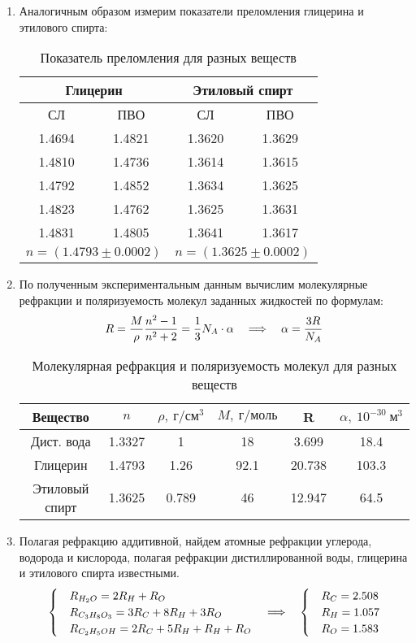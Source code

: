 \documentclass{lab}
\begin{document}
\begin{enumerate}
\item
Аналогичным образом измерим показатели преломления глицерина и этилового спирта:
\begin{table}[H]
	\centering
	\begin{tabular}{|cc|cc|}
		\hline
		\multicolumn{2}{|c|}{Глицерин} & \multicolumn{2}{c|}{Этиловый спирт} \\ \hline
		СЛ & ПВО & СЛ & ПВО \\
		1.4694 & 1.4821 & 1.3620 & 1.3629 \\
		1.4810 & 1.4736 & 1.3614 & 1.3615 \\
		1.4792 & 1.4852 & 1.3634 & 1.3625 \\
		1.4823 & 1.4762 & 1.3625 & 1.3631 \\
		1.4831 & 1.4805 & 1.3641 & 1.3617 \\ \hline
		\multicolumn{2}{|c|}{$ n = (1.4793 \pm 0.0002) $} & \multicolumn{2}{c|}{$ n = (1.3625 \pm 0.0002) $} \\ \hline
	\end{tabular}
	\caption{Показатель преломления для разных веществ}
	\label{tab_3}
\end{table}

\item
По полученным экспериментальным данным вычислим молекулярные рефракции и поляризуемость молекул заданных жидкостей по формулам:
\begin{equation}
R = \dfrac{M}{\rho} \dfrac{n^2 - 1}{n^2 + 2} = \dfrac{1}{3} N_A \cdot \alpha \quad \Longrightarrow \quad \alpha = \dfrac{3R}{N_A}
\end{equation}
\begin{table}[H]
	\centering
	\begin{tabular}{|c|c|c|c|c|c|}
		\hline
		Вещество & $ n $ & $ \rho, ~ г/см^3 $ & $ M, ~ г/моль $ & R & $ \alpha, ~ 10^{-30} ~ м^3 $ \\ \hline
		Дист. вода & 1.3327 & 1 & 18 & 3.699 & 18.4 \\
		Глицерин & 1.4793 & 1.26 & 92.1 & 20.738 & 103.3 \\
		Этиловый спирт & 1.3625 & 0.789 & 46 & 12.947 & 64.5 \\ \hline
	\end{tabular}
	\caption{Молекулярная рефракция и поляризуемость молекул для разных веществ}
	\label{tab_4}
\end{table}

\item
Полагая рефракцию аддитивной, найдем атомные рефракции углерода, водорода и кислорода, полагая рефракции дистиллированной воды, глицерина и этилового спирта известными.
\begin{equation}
\begin{cases}
&R_{H_2O} = 2R_{H} + R_{O}\\
&R_{C_3H_8O_3} = 3R_{C} + 8R_{H} + 3R_{O}\\
&R_{C_2H_5OH} = 2R_{C} + 5R_{H} + R_{H} + R_{O}
\end{cases}
\quad \Longrightarrow \quad
\begin{cases}
&R_C = 2.508\\
&R_H = 1.057\\
&R_O = 1.583
\end{cases}
\end{equation}


\end{enumerate}
\end{document}

